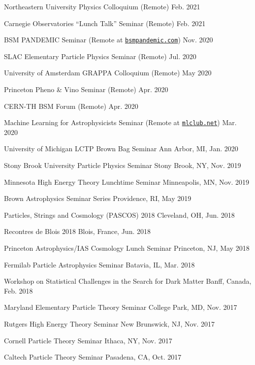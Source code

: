 \documentclass[letterpaper,11pt]{article}
\newenvironment{packed_itemize}{
\begin{itemize}[label=\raisebox{0.25ex}{\tiny$\bullet$}]
  \setlength{\itemsep}{4.0pt}
  \setlength{\parskip}{0pt}
  \setlength{\parsep}{0pt}}{\end{itemize}
}
\begin{document}
\begin{packed_itemize}
  \item Northeastern University Physics Colloquium (Remote) \hfill Feb. 2021
  \item Carnegie Observatories ``Lunch Talk'' Seminar (Remote) \hfill Feb. 2021
  \item BSM PANDEMIC Seminar  (Remote at \href{https://www.bsmpandemic.com/}{\texttt{bsmpandemic.com}}) \hfill Nov. 2020
  \item SLAC Elementary Particle Physics Seminar (Remote) \hfill Jul. 2020
  \item University of Amsterdam GRAPPA Colloquium (Remote) \hfill May 2020
  \item Princeton Pheno \& Vino Seminar (Remote) \hfill Apr. 2020
  \item CERN-TH BSM Forum (Remote) \hfill  Apr. 2020
  \item Machine Learning for Astrophysicists Seminar (Remote at \href{https://docs.google.com/document/d/1GGtE-YIuAWlmpKSr38_kyiF-Fklszhkh4FkiYWzBAho/pub}{\texttt{mlclub.net}}) \hfill  Mar. 2020
  \item University of Michigan LCTP Brown Bag Seminar \hfill Ann Arbor, MI, Jan. 2020
  \item Stony Brook University Particle Physics Seminar \hfill Stony Brook, NY, Nov. 2019
  \item Minnesota High Energy Theory Lunchtime Seminar \hfill  Minneapolis, MN, Nov. 2019
  \item Brown Astrophysics Seminar Series \hfill Providence, RI, May 2019
  \item Particles, Strings and Cosmology (PASCOS) 2018 \hfill Cleveland, OH, Jun. 2018
  \item Recontres de Blois 2018 \hfill Blois, France, Jun. 2018
  \item Princeton Astrophysics/IAS Cosmology Lunch Seminar \hfill Princeton, NJ, May 2018
  \item Fermilab Particle Astrophysics Seminar \hfill Batavia, IL, Mar. 2018
  \item Workshop on Statistical Challenges in the Search for Dark Matter \hfill Banff, Canada, Feb. 2018
  \item Maryland Elementary Particle Theory Seminar \hfill College Park, MD, Nov. 2017
  \item Rutgers High Energy Theory Seminar \hfill New Brunswick, NJ, Nov. 2017
  \item Cornell Particle Theory Seminar \hfill Ithaca, NY, Nov. 2017
  \item Caltech Particle Theory Seminar \hfill Pasadena, CA, Oct. 2017

\end{packed_itemize}
\end{document}
